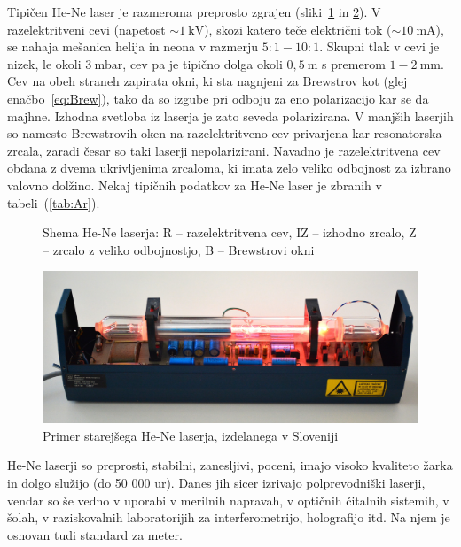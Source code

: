 Tipičen He-Ne laser je razmeroma preprosto zgrajen (sliki~\ref{fig:HeNeShema}
in \ref{fig:Iskra}).
V razelektritveni cevi (napetost  $\sim 1~\si{\kilo\volt}$), skozi
katero teče električni tok ($\sim 10~\si{\milli\ampere}$), 
se nahaja mešanica helija in neona v razmerju 
$5:1 - 10:1$. Skupni tlak v cevi je nizek, le okoli $3~\si{\milli\bar}$, 
cev pa je tipično dolga okoli $0,5~\si{\metre}$ s premerom $1-2~\si{\milli\metre}$.  
Cev na obeh straneh zapirata okni, ki sta nagnjeni za Brewstrov kot (glej enačbo~\ref{eq:Brew}), 
tako da so izgube pri odboju za eno polarizacijo kar se da majhne.
Izhodna svetloba iz laserja je zato seveda polarizirana. V manjših laserjih
so namesto Brewstrovih oken na razelektritveno cev privarjena kar
resonatorska zrcala, zaradi česar so taki laserji nepolarizirani. 
Navadno je razelektritvena cev obdana z dvema ukrivljenima zrcaloma, 
ki imata zelo veliko odbojnost za izbrano valovno dolžino.
Nekaj tipičnih podatkov za He-Ne laser je zbranih v tabeli~(\ref{tab:Ar}).
\begin{figure}[h]
\centering
\def\svgwidth{100truemm} 

\caption{Shema He-Ne laserja: R -- razelektritvena cev, IZ -- izhodno zrcalo, Z -- zrcalo
z veliko odbojnostjo, B -- Brewstrovi okni}
\label{fig:HeNeShema}
\end{figure}

\begin{figure}[h]
\centering
\includegraphics[width=120truemm]{slike/07_HeNe.jpg}
\caption{Primer starejšega He-Ne laserja, izdelanega v Sloveniji}
\label{fig:Iskra}
\end{figure}

He-Ne laserji so preprosti, stabilni, zanesljivi, poceni, imajo visoko kvaliteto žarka
in dolgo služijo (do 50 000 ur).
Danes jih sicer izrivajo polprevodniški laserji, vendar so še vedno v uporabi
v merilnih napravah, v optičnih čitalnih sistemih, v šolah, v raziskovalnih 
laboratorijih za interferometrijo, holografijo itd. Na njem je osnovan tudi 
standard za meter.

